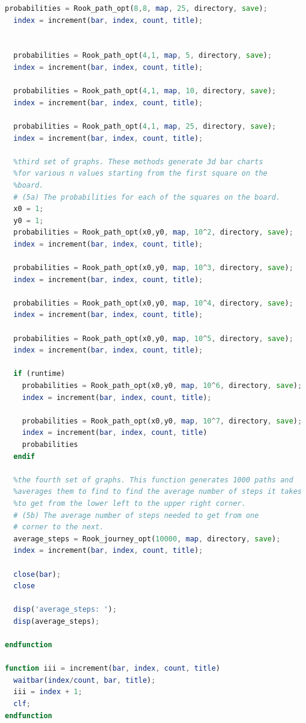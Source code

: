 \documentclass{amsart}
\numberwithin{equation}{section}
\begin{document}
\begin{lstlisting}[language=octave]
  probabilities = Rook_path_opt(8,8, map, 25, directory, save);
  index = increment(bar, index, count, title);
  
  
  probabilities = Rook_path_opt(4,1, map, 5, directory, save);
  index = increment(bar, index, count, title);
  
  probabilities = Rook_path_opt(4,1, map, 10, directory, save);
  index = increment(bar, index, count, title);
  
  probabilities = Rook_path_opt(4,1, map, 25, directory, save);
  index = increment(bar, index, count, title);
  
  %third set of graphs. These methods generate 3d bar charts
  %for various n values starting from the first square on the
  %board.
  # (5a) The probabilities for each of the squares on the board.
  x0 = 1;
  y0 = 1;
  probabilities = Rook_path_opt(x0,y0, map, 10^2, directory, save);
  index = increment(bar, index, count, title);
  
  probabilities = Rook_path_opt(x0,y0, map, 10^3, directory, save);
  index = increment(bar, index, count, title);
  
  probabilities = Rook_path_opt(x0,y0, map, 10^4, directory, save);
  index = increment(bar, index, count, title);
  
  probabilities = Rook_path_opt(x0,y0, map, 10^5, directory, save);
  index = increment(bar, index, count, title);
  
  if (runtime)
    probabilities = Rook_path_opt(x0,y0, map, 10^6, directory, save);
    index = increment(bar, index, count, title);
    
    probabilities = Rook_path_opt(x0,y0, map, 10^7, directory, save);
    index = increment(bar, index, count, title)
    probabilities
  endif
  
  %the fourth set of graphs. This function generates 1000 paths and
  %averages them to find to find the average number of steps it takes
  %to get from the lower left to the upper right corner.
  # (5b) The average number of steps needed to get from one
  # corner to the next.
  average_steps = Rook_journey_opt(10000, map, directory, save);
  index = increment(bar, index, count, title);
  
  close(bar);
  close
  
  disp('average_steps: ');
  disp(average_steps);

endfunction

function iii = increment(bar, index, count, title)
  waitbar(index/count, bar, title);
  iii = index + 1;
  clf;
endfunction
\end{lstlisting}
\end{document}
